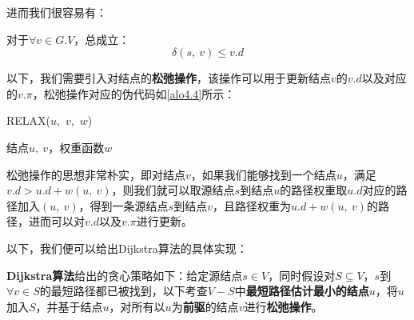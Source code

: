 \documentclass[12pt,a4paper,violet,oneside]{bbe}
\begin{document}
进而我们很容易有：
\begin{lemma}
	对于$\forall v\in G.V$，总成立：
	$$
	\delta(s,~v)\leqslant v.d
	$$
\end{lemma}

以下，我们需要引入对结点的\textbf{松弛操作}，该操作可以用于更新结点$v$的$v.d$以及对应的$v.\pi$，松弛操作对应的伪代码如\cref{alo4.4}所示：
\\
\begin{algorithm}[H]
	\caption{RELAX($u$,~$v$,~$w$)}
	\label{alo4.4}
	\begin{algorithmic}[1] 
		\Require 结点$u,~v$，权重函数$w$\textcolor{blue}{}
		\EndIf 
	\end{algorithmic} 
\end{algorithm}

松弛操作的思想非常朴实，即对结点$v$，如果我们能够找到一个结点$u$，满足$v.d>u.d+w(u,~v)$，则我们就可以取源结点$s$到结点$u$的路径权重取$u.d$对应的路径加入$(u,~v)$，得到一条源结点$s$到结点$v$，且路径权重为$u.d+w(u,~v)$的路径，进而可以对$v.d$以及$v.\pi$进行更新。

以下，我们便可以给出Dijkstra算法的具体实现：

\textbf{Dijkstra算法}给出的贪心策略如下：给定源结点$s\in V$，同时假设对$S\subseteq V$，$s$到$\forall v\in S$的最短路径都已被找到，以下考查$V-S$中\textbf{最短路径估计最小的结点}$u$，将$u$加入$S$，并基于结点$u$，对所有以$u$为\textbf{前驱}的结点$v$进行\textbf{松弛操作}。
\end{document}
